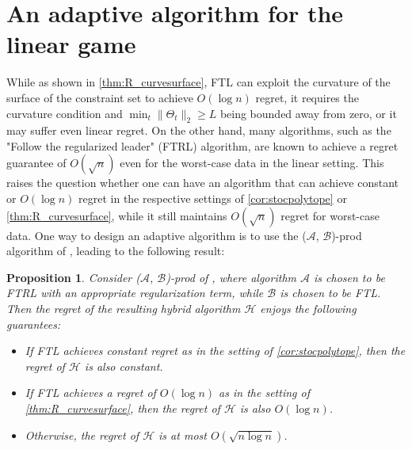 \documentclass[english]{article}
\newcommand{\todoa}[2][]{\todo[color=Purple!20,size=\tiny,#1]{A: #2}}
\newcommand{\cA}{\mathcal{A}}
\newcommand{\cB}{\mathcal{B}}
\newcommand{\cH}{\mathcal{H}}
\newtheorem{prop}[thm]{Proposition}
\begin{document}
\section{An adaptive algorithm for the linear game}
While as shown in \cref{thm:R_curvesurface}, FTL can exploit the curvature of the surface of the constraint set to achieve $O(\log n)$ regret, it requires the curvature condition and $\min_t \|\Theta_t\|_2 \ge L$ being bounded away from zero, or
 it may suffer even linear regret.
On the other hand, many algorithms,  such as the "Follow the regularized leader" (FTRL) algorithm, are known to achieve a regret guarantee of $O(\sqrt{n})$ even for the worst-case data in the linear setting.
This raises the question whether one can have an algorithm that can 
achieve constant or $O(\log n)$ regret in the respective settings of  \cref{cor:stocpolytope} or \cref{thm:R_curvesurface},
while it still maintains $O(\sqrt{n})$ regret for worst-case data. 
One way to design an adaptive algorithm is to use the ($\cA$, $\cB$)-prod algorithm of \citet{sani2014exploiting}, leading to the following result:
\begin{prop}
Consider ($\cA$, $\cB$)-prod of \citet{sani2014exploiting}, where algorithm \todoa{Do we need to write out ($\cA$, $\cB$)-prod?}
 $\cA$ is chosen to be FTRL with an appropriate regularization term, 
 while $\cB$ is chosen to be FTL. 
Then the regret of the resulting hybrid algorithm $\cH$ enjoys the following guarantees:
\begin{itemize}\setlength{\itemsep}{0pt}
\item If FTL achieves constant regret as in the setting of \cref{cor:stocpolytope}, then the regret of $\cH$ is also constant.
\item If FTL achieves a regret of $O(\log n)$ as in the setting of \cref{thm:R_curvesurface}, then the regret of $\cH$ is also $O(\log n)$.
\item Otherwise, the regret of $\cH$ is at most $O(\sqrt{n\log n})$.
\end{itemize}
\end{prop} 
\end{document}
